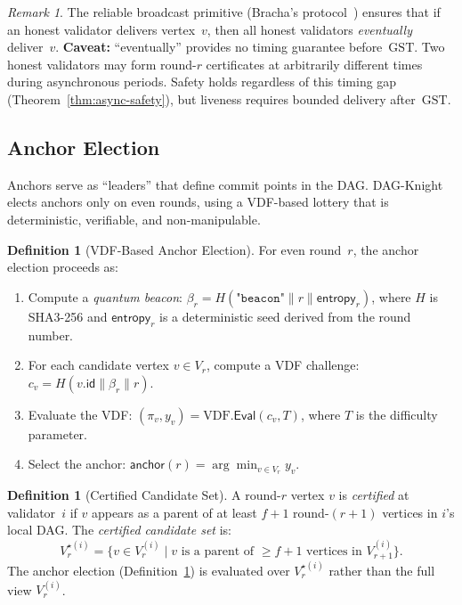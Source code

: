 \documentclass[11pt,a4paper]{article}
\theoremstyle{definition}
\newtheorem{definition}[theorem]{Definition}
\theoremstyle{remark}
\newtheorem{remark}[theorem]{Remark}
\newcommand{\DK}{\textsf{DAG-Knight}}
\newcommand{\GST}{\mathrm{GST}}
\newcommand{\VDF}{\mathrm{VDF}}
\newcommand{\anchor}{\mathsf{anchor}}
\begin{document}
\begin{remark}\label{rem:reliable-broadcast}
The reliable broadcast primitive (Bracha's protocol~\cite{bracha1987asynchronous})
ensures that if an honest validator delivers vertex~$v$, then all honest
validators \emph{eventually} deliver~$v$.
\textbf{Caveat:} ``eventually'' provides no timing guarantee before~$\GST$.
Two honest validators may form round-$r$ certificates at arbitrarily
different times during asynchronous periods.
Safety holds regardless of this timing gap (Theorem~\ref{thm:async-safety}),
but liveness requires bounded delivery after~$\GST$.
\end{remark}

\subsection{Anchor Election}\label{sec:anchor-election}

Anchors serve as ``leaders'' that define commit points in the DAG.
\DK{} elects anchors only on even rounds, using a VDF-based lottery
that is deterministic, verifiable, and non-manipulable.

\begin{definition}[VDF-Based Anchor Election]\label{def:anchor-election}
For even round~$r$, the anchor election proceeds as:
\begin{enumerate}[nosep]
  \item Compute a \emph{quantum beacon}:
    $\beta_r = H(\texttt{"beacon"} \| r \| \mathsf{entropy}_r)$,
    where $H$ is SHA3-256 and $\mathsf{entropy}_r$ is a deterministic
    seed derived from the round number.
  \item For each candidate vertex $v \in V_r$, compute a VDF challenge:
    $c_v = H(v.\mathsf{id} \| \beta_r \| r)$.
  \item Evaluate the VDF: $(\pi_v, y_v) = \VDF.\mathsf{Eval}(c_v, T)$,
    where $T$ is the difficulty parameter.
  \item Select the anchor: $\anchor(r) = \arg\min_{v \in V_r} y_v$.
\end{enumerate}
\end{definition}

\begin{definition}[Certified Candidate Set]\label{def:certified-candidates}
A round-$r$ vertex $v$ is \emph{certified} at validator~$i$ if $v$ appears
as a parent of at least $f+1$ round-$(r\!+\!1)$ vertices in $i$'s local DAG.
The \emph{certified candidate set} is:
\[
  V_r^{\star(i)} = \{v \in V_r^{(i)} \mid v \text{ is a parent of } \geq f+1 \text{ vertices in } V_{r+1}^{(i)}\}.
\]
The anchor election (Definition~\ref{def:anchor-election}) is evaluated
over $V_r^{\star(i)}$ rather than the full view $V_r^{(i)}$.
\end{definition}
\end{document}
